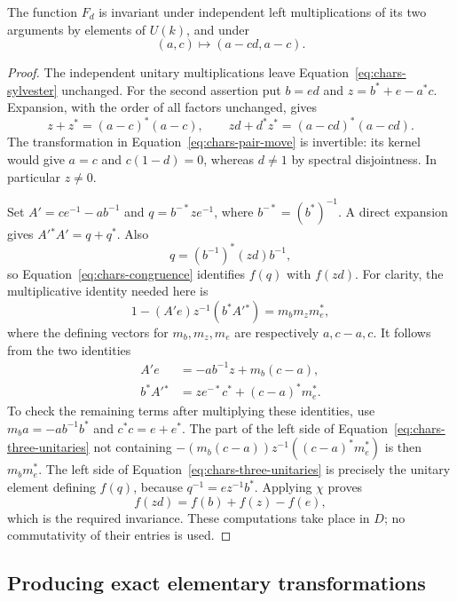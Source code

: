 \begin{lemma}\label{lem:chars-pair-invariance}
The function $F_d$ is invariant under independent left multiplications
of its two arguments by elements of $U(k)$, and under
\begin{equation}\label{eq:chars-pair-move}
 (a,c)\longmapsto(a-cd,a-c).
\end{equation}
\end{lemma}

\begin{proof}
The independent unitary multiplications leave
Equation~\ref{eq:chars-sylvester} unchanged. For the second assertion put
$b=ed$ and $z=b^*+e-a^*c$. Expansion, with the order of all factors
unchanged, gives
\[
 z+z^*=(a-c)^*(a-c),\qquad
 zd+d^*z^*=(a-cd)^*(a-cd).
\]
The transformation in Equation~\ref{eq:chars-pair-move} is invertible:
its kernel would give $a=c$ and $c(1-d)=0$, whereas $d\ne1$ by spectral
disjointness. In particular $z\ne0$.

Set $A'=ce^{-1}-ab^{-1}$ and $q=b^{-*}ze^{-1}$, where
$b^{-*}=(b^*)^{-1}$. A direct expansion gives $A'{}^*A'=q+q^*$.
Also
\[
 q=(b^{-1})^*(zd)b^{-1},
\]
so Equation~\ref{eq:chars-congruence} identifies $f(q)$ with $f(zd)$.
For clarity, the multiplicative identity needed here is
\begin{equation}\label{eq:chars-three-unitaries}
 1-(A'e)z^{-1}(b^*A'{}^*)=m_bm_zm_e^*,
\end{equation}
where the defining vectors for $m_b,m_z,m_e$ are respectively
$a,c-a,c$. It follows from the two identities
\begin{align*}
 A'e&=-ab^{-1}z+m_b(c-a),\\
 b^*A'{}^*&=ze^{-*}c^*+(c-a)^*m_e^*.
\end{align*}
To check the remaining terms after multiplying these identities, use
$m_ba=-ab^{-1}b^*$ and $c^*c=e+e^*$. The part of the left side of
Equation~\ref{eq:chars-three-unitaries} not containing
$-(m_b(c-a))z^{-1}((c-a)^*m_e^*)$ is then $m_bm_e^*$.
The left side of Equation~\ref{eq:chars-three-unitaries} is precisely
the unitary element defining $f(q)$, because $q^{-1}=ez^{-1}b^*$.
Applying $\chi$ proves
\[
 f(zd)=f(b)+f(z)-f(e),
\]
which is the required invariance. These computations take place in
$D$; no commutativity of their entries is used.
\end{proof}

\subsection{Producing exact elementary transformations}

